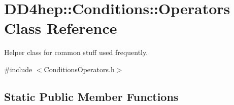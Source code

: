 \hypertarget{class_d_d4hep_1_1_conditions_1_1_operators}{}\section{D\+D4hep\+:\+:Conditions\+:\+:Operators Class Reference}
\label{class_d_d4hep_1_1_conditions_1_1_operators}


Helper class for common stuff used frequently.  




{\ttfamily \#include $<$Conditions\+Operators.\+h$>$}

\subsection*{Static Public Member Functions}

